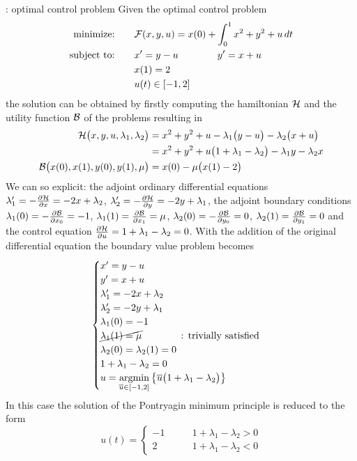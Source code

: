 \begin{example}{: optimal control problem}
	Given the optimal control problem
	\begin{align*}
		\textrm{minimize:} \qquad & \mathcal{F} (x,y,u) = x(0) + \int_0^1 x^2 + y^2 + u \, dt   \\
		\textrm{subject to:} \qquad & x' = y - u \qquad \qquad y' = x+u \\
		&x(1) = 2 \\ & u(t) \in [-1,2]
	\end{align*}
	the solution can be obtained by firstly computing the hamiltonian $\mathcal{H}$ and the utility function $\mathcal{B}$ of the problems resulting in
	\begin{align*}
		\mathcal{H}\big(x,y,u,\lambda_1,\lambda_2\big) & = x^2 + y^2 + u - \lambda_1 \big(y-u\big) - \lambda_2 \big(x + u\big) \\
		& = x^2 + y^2 + u \big(1 + \lambda_1 - \lambda_2\big) - \lambda_1 y - \lambda_2 x \\
		\mathcal{B}\big(x(0),x(1), y(0), y(1), \mu\big) & = x(0) - \mu \big( x(1) - 2\big)
	\end{align*}
	We can so explicit: the adjoint ordinary differential equations $\lambda_1' = -\frac{\partial \mathcal{H}}{\partial x} = - 2x + \lambda_2$, $\lambda_2' = -\frac{\partial \mathcal{H}}{\partial y} = -2y + \lambda_1$, the adjoint boundary conditions $\lambda_1(0) = - \frac{\partial \mathcal{B}}{\partial x_0} = - 1$, $\lambda_1(1) = \frac{\partial \mathcal{B}}{\partial x_1} = \mu $, $\lambda_2(0) = -\frac{\partial \mathcal{B}}{\partial y_0} = 0$, $\lambda_2(1) = \frac{\partial \mathcal{B}}{\partial y_1} = 0$ and the control equation $\frac{\partial \mathcal{H}}{\partial u} = 1 + \lambda_1 - \lambda_2 = 0$. With the addition of the original differential equation the boundary value problem becomes
	\[ \begin{cases}
		x' = y - u \\ y' = x+u \\
		\lambda_1' = -2x + \lambda_2 \\ \lambda_2' = -2y + \lambda_1 \\
		\lambda_1(0) = -1 \\ \cancel{\lambda_1(1) = \mu} \qquad \qquad \textrm{: trivially satisfied} \\
		\lambda_2(0) = \lambda_2(1) = 0 \\
		1 + \lambda_1 - \lambda_2 = 0 \\
		u = \underset{\overline u \in [-1,2]}{\textrm{argmin}} \left\{ \overline u \big(1 + \lambda_1 - \lambda_2\big)  \right\}
	\end{cases} \]
	In this case the solution of the Pontryagin minimum principle is reduced to the form
	\[ u(t) = \begin{cases}
		-1 \qquad & 1 + \lambda_1 - \lambda_2 > 0 \\
		2 & 1 + \lambda_1 - \lambda_2 < 0
	\end{cases} \]
	
\end{example}

